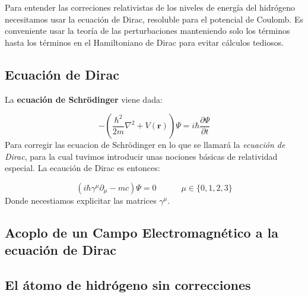 \documentclass[12pt,a4paper]{article}
\numberwithin{equation}{section}
\numberwithin{figure}{section}
\newcommand{\parentesis}[1]{\left( #1  \right)}
\newcommand{\parciales}[2]{\frac{\partial #1}{\partial #2}}
\newcommand{\tquad}{\quad \quad \quad}
\newcommand{\rn}{\mathbf{r}}
\begin{document}
Para entender las correciones relativistas de los niveles de energía del hidrógeno necesitamos usar la ecuación de Dirac, resoluble para el potencial de Coulomb. Es conveniente usar la teoría de las perturbaciones manteniendo solo los términos hasta los términos en el Hamiltoniano de Dirac para evitar cálculos tediosos. \\

\subsection{Ecuación de Dirac}

La \textbf{ecuación de Schrödinger} viene dada:

\begin{equation}
    - \parentesis{\frac{\hbar^2}{2m} \nabla^2 + V(\rn) }\Psi = i \hbar \parciales{\Psi}{t} 
\end{equation}
Para corregir las ecuacion de Schrödinger en lo que se llamará la \textit{ecuación de Dirac}, para la cual tuvimos introducir unas nociones básicas de relatividad especial. La ecaución de Dirac es entonces:

\begin{equation}
    (i \hbar \gamma^{\mu} \partial_\mu - m c) \Psi = 0 \tquad \mu \in \{ 0,1,2,3 \}
\end{equation}
Donde necestiamos explicitar las matrices $\gamma^{\mu}$.


\subsection{Acoplo de un Campo Electromagnético a la ecuación de Dirac}

\subsection{El átomo de hidrógeno sin correcciones}
\end{document}
